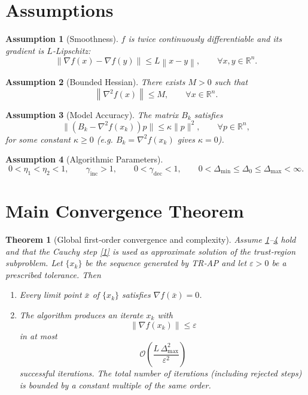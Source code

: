 \documentclass{article}
\newtheorem{theorem}{Theorem}
\newtheorem{assumption}{Assumption}
\newcommand{\norm}[1]{\left\lVert#1\right\rVert}
\newcommand{\R}{\mathbb{R}}
\begin{document}
\newpage
\section*{Assumptions}
\begin{assumption}[Smoothness]\label{ass:smooth}
$f$ is twice continuously differentiable and its gradient is $L$‑Lipschitz:
\[
\norm{\nabla f(x)-\nabla f(y)}\le L\norm{x-y},
\qquad\forall x,y\in\R^{n}.
\]
\end{assumption}
\begin{assumption}[Bounded Hessian]\label{ass:hessian}
There exists $M>0$ such that
\[
\norm{\nabla^{2}f(x)}\le M,\qquad\forall x\in\R^{n}.
\]
\end{assumption}
\begin{assumption}[Model Accuracy]\label{ass:model}
The matrix $B_{k}$ satisfies
\[
\bigl\| (B_{k}-\nabla^{2}f(x_{k}))p\bigr\|\le \kappa\|p\|^{2},
\qquad\forall p\in\R^{n},
\]
for some constant $\kappa\ge0$ (e.g. $B_{k}= \nabla^{2}f(x_{k})$ gives $\kappa=0$).
\end{assumption}
\begin{assumption}[Algorithmic Parameters]\label{ass:params}
\[
0<\eta_{1}<\eta_{2}<1,\qquad 
\gamma_{\text{inc}}>1,\qquad 
0<\gamma_{\text{dec}}<1,\qquad 
0<\Delta_{\min}\le\Delta_{0}\le\Delta_{\max}<\infty .
\]
\end{assumption}

\section*{Main Convergence Theorem}
\begin{theorem}[Global first‑order convergence and complexity]\label{thm:main}
Assume \ref{ass:smooth}–\ref{ass:params} hold and that the Cauchy step
\eqref{1} is used as approximate solution of the trust‑region subproblem.
Let $\{x_{k}\}$ be the sequence generated by TR‑AP and let $\varepsilon>0$ be a prescribed tolerance.
Then
\begin{enumerate}[label=(\roman*)]
\item\label{it:stationary} Every limit point $\bar x$ of $\{x_{k}\}$ satisfies $\nabla f(\bar x)=0$.
\item\label{it:complexity} The algorithm produces an iterate $x_{k}$ with
\[
\norm{\nabla f(x_{k})}\le\varepsilon
\]
in at most
\[
\mathcal{O}\!\left(\frac{L\,\Delta_{\max}^{2}}{\varepsilon^{2}}\right)
\]
successful iterations. The total number of iterations (including rejected steps) is bounded by a constant multiple of the same order.
\end{enumerate}
\end{theorem}
\end{document}
